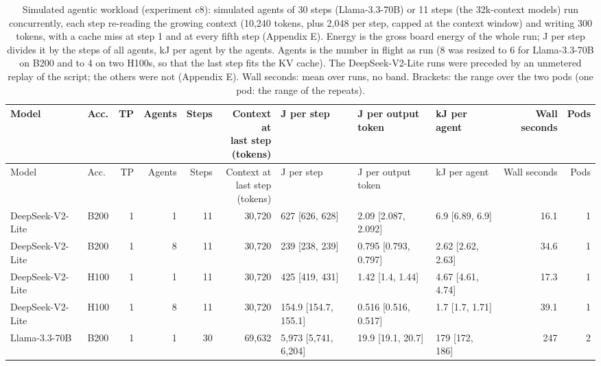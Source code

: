 \begin{landscape}
\begingroup
\scriptsize
\setlength{\tabcolsep}{3pt}
\begin{longtable}{llrrrrlllrr}
\caption{Simulated agentic workload (experiment c8): simulated agents of 30 steps (Llama-3.3-70B) or 11 steps (the 32k-context models) run concurrently, each step re-reading the growing context (10,240 tokens, plus 2,048 per step, capped at the context window) and writing 300 tokens, with a cache miss at step 1 and at every fifth step (Appendix E). Energy is the gross board energy of the whole run; J per step divides it by the steps of all agents, kJ per agent by the agents. Agents is the number in flight as run (8 was resized to 6 for Llama-3.3-70B on B200 and to 4 on two H100s, so that the last step fits the KV cache). The DeepSeek-V2-Lite runs were preceded by an unmetered replay of the script; the others were not (Appendix E). Wall seconds: mean over runs, no band. Brackets: the range over the two pods (one pod: the range of the repeats).}\label{tab:agent}\\
\toprule
Model & Acc. & TP & Agents & Steps & \makecell[r]{Context at\\last step\\(tokens)} & J per step & \makecell[l]{J per output\\token} & kJ per agent & Wall seconds & Pods \\
\midrule
\endfirsthead
\toprule
Model & Acc. & TP & Agents & Steps & \makecell[r]{Context at\\last step\\(tokens)} & J per step & \makecell[l]{J per output\\token} & kJ per agent & Wall seconds & Pods \\
\midrule
\endhead
\bottomrule
\endfoot
DeepSeek-V2-Lite & B200 & 1 & 1 & 11 & 30,720 & 627 {[}626, 628{]} & 2.09 {[}2.087, 2.092{]} & 6.9 {[}6.89, 6.9{]} & 16.1 & 1 \\
DeepSeek-V2-Lite & B200 & 1 & 8 & 11 & 30,720 & 239 {[}238, 239{]} & 0.795 {[}0.793, 0.797{]} & 2.62 {[}2.62, 2.63{]} & 34.6 & 1 \\
DeepSeek-V2-Lite & H100 & 1 & 1 & 11 & 30,720 & 425 {[}419, 431{]} & 1.42 {[}1.4, 1.44{]} & 4.67 {[}4.61, 4.74{]} & 17.3 & 1 \\
DeepSeek-V2-Lite & H100 & 1 & 8 & 11 & 30,720 & 154.9 {[}154.7, 155.1{]} & 0.516 {[}0.516, 0.517{]} & 1.7 {[}1.7, 1.71{]} & 39.1 & 1 \\
Llama-3.3-70B & B200 & 1 & 1 & 30 & 69,632 & 5,973 {[}5,741, 6,204{]} & 19.9 {[}19.1, 20.7{]} & 179 {[}172, 186{]} & 247 & 2 \\

\end{longtable}
\end{landscape}
